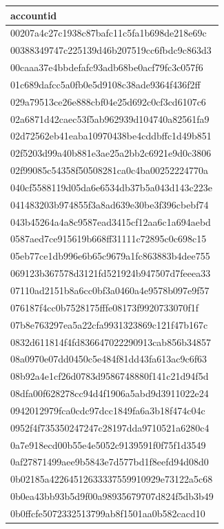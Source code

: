\begin{tabular}{l}
\toprule
accountid \\
\midrule
00207a4c27c1938c87bafc11c5fa1b698de218e69c \\
00388349747c225139d46b207519cc6fbdc9c863d3 \\
00caaa37e4bbdefafc93adb68be0acf79fc3c057f6 \\
01c689dafcc5a0fb0e5d9108c38ade9364f436f2ff \\
029a79513ce26e888cbf04e25d692c0cf3cd6107c6 \\
02a6871d42caec53f5ab962939d104740a82561fa9 \\
02d72562eb41eaba10970438be4cddbffc1d49b851 \\
02f5203d99a40b881e3ae25a2bb2c6921e9d0c3806 \\
02f99085c54358f50508281ca0c4ba00252224770a \\
040cf5588119d05da6e6534db37b5a043d143c223e \\
041483203b974855f3a8ad639e30be3f396cbebf74 \\
043b45264a4a8c9587ead3415cf12aa6c1a694aebd \\
0587aed7ce915619b668ff31111c72895c0c698c15 \\
05eb77ce1db996e6b65c9679a1fc863883b4dee755 \\
069123b367578d3121fd521924b947507d7feeea33 \\
07110ad2151b8a6cc0bf3a0460a4e9578b097e9f57 \\
076187f4cc0b7528175fffe08173f9920733070f1f \\
07b8e763297ea5a22cfa9931323869c121f47b167c \\
0832d611814f4fd836647022290913cab856b34857 \\
08a0970e07dd0450c5e484f81dd43fa613ac9c6f63 \\
08b92a4e1cf26d0783d9586748880f141c21d94f5d \\
08dfa00f628278cc94d4f1906a5abd9d3911022e24 \\
0942012979fca0cdc97dcc1849fa6a3b18f474c04c \\
0952f4f735350247247c28197dda9710521a6280c4 \\
0a7e918ecd00b55e4e5052c9139591f0f75f1d3549 \\
0af27871499aee9b5843e7d577bd1f8eefd94d08d0 \\
0b02185a42264512633337559910929e73122a5c68 \\
0b0ea43bb93b5d9f00a98935679707d824f5db3b49 \\
0b0ffcfe5072332513799ab8f1501aa0b582cacd10 \\

\end{tabular}

